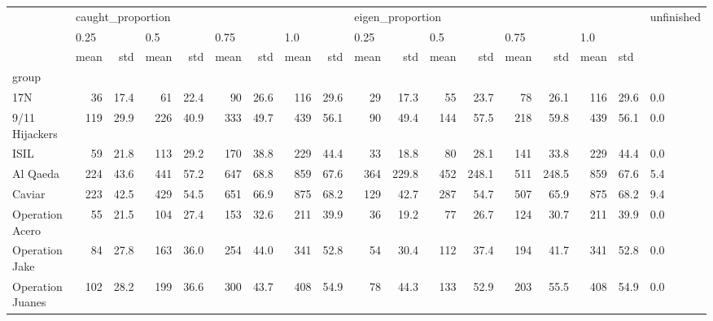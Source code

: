 \begin{tabular}{lrrrrrrrrrrrrrrrrl}
\toprule
{} & \multicolumn{8}{l}{caught\_proportion} & \multicolumn{8}{l}{eigen\_proportion} & unfinished \\
{} & \multicolumn{2}{l}{0.25} & \multicolumn{2}{l}{0.5} & \multicolumn{2}{l}{0.75} & \multicolumn{2}{l}{1.0} & \multicolumn{2}{l}{0.25} & \multicolumn{2}{l}{0.5} & \multicolumn{2}{l}{0.75} & \multicolumn{3}{l}{1.0} \\
{} &              mean &   std & mean &   std & mean &   std & mean &   std &             mean &    std & mean &    std & mean &    std & mean & \multicolumn{2}{l}{std} \\
group                &                   &       &      &       &      &       &      &       &                  &        &      &        &      &        &      &       &            \\
\midrule
17N                  &                36 &  17.4 &   61 &  22.4 &   90 &  26.6 &  116 &  29.6 &               29 &   17.3 &   55 &   23.7 &   78 &   26.1 &  116 &  29.6 &        0.0 \\
9/11 Hijackers       &               119 &  29.9 &  226 &  40.9 &  333 &  49.7 &  439 &  56.1 &               90 &   49.4 &  144 &   57.5 &  218 &   59.8 &  439 &  56.1 &        0.0 \\
ISIL                 &                59 &  21.8 &  113 &  29.2 &  170 &  38.8 &  229 &  44.4 &               33 &   18.8 &   80 &   28.1 &  141 &   33.8 &  229 &  44.4 &        0.0 \\
Al Qaeda             &               224 &  43.6 &  441 &  57.2 &  647 &  68.8 &  859 &  67.6 &              364 &  229.8 &  452 &  248.1 &  511 &  248.5 &  859 &  67.6 &        5.4 \\
Caviar               &               223 &  42.5 &  429 &  54.5 &  651 &  66.9 &  875 &  68.2 &              129 &   42.7 &  287 &   54.7 &  507 &   65.9 &  875 &  68.2 &        9.4 \\
Operation Acero      &                55 &  21.5 &  104 &  27.4 &  153 &  32.6 &  211 &  39.9 &               36 &   19.2 &   77 &   26.7 &  124 &   30.7 &  211 &  39.9 &        0.0 \\
Operation Jake       &                84 &  27.8 &  163 &  36.0 &  254 &  44.0 &  341 &  52.8 &               54 &   30.4 &  112 &   37.4 &  194 &   41.7 &  341 &  52.8 &        0.0 \\
Operation Juanes     &               102 &  28.2 &  199 &  36.6 &  300 &  43.7 &  408 &  54.9 &               78 &   44.3 &  133 &   52.9 &  203 &   55.5 &  408 &  54.9 &        0.0 \\

\end{tabular}
